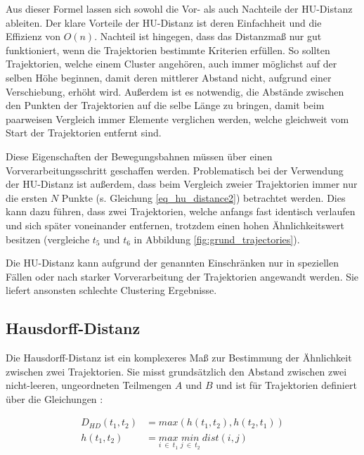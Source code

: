 Aus dieser Formel lassen sich sowohl die Vor- als auch Nachteile der HU-Distanz ableiten. Der klare Vorteile der
HU-Distanz ist deren Einfachheit und die Effizienz von $O(n)$.
Nachteil ist hingegen, dass das Distanzmaß nur gut funktioniert, wenn die Trajektorien bestimmte
Kriterien erfüllen. So sollten Trajektorien, welche einem Cluster angehören, auch immer möglichst auf der selben Höhe beginnen,
damit deren mittlerer Abstand nicht, aufgrund einer Verschiebung, erhöht wird.
Außerdem ist es notwendig, die Abstände zwischen den Punkten der Trajektorien auf die selbe Länge zu bringen,
damit beim paarweisen Vergleich immer Elemente verglichen werden, welche gleichweit vom Start der
Trajektorien entfernt sind.

Diese Eigenschaften der Bewegungsbahnen müssen über einen Vorverarbeitungsschritt geschaffen werden.
Problematisch bei der Verwendung der HU-Distanz ist außerdem, dass beim Vergleich zweier Trajektorien immer nur
die ersten $N$ Punkte (s. Gleichung \ref{eq_hu_distance2}) betrachtet werden. Dies kann dazu führen, dass zwei
Trajektorien, welche anfangs fast identisch verlaufen und sich später voneinander entfernen, trotzdem einen hohen
Ähnlichkeitswert besitzen (vergleiche $t_5$ und $t_6$ in Abbildung \ref{fig:grund_trajectories}).

Die HU-Distanz kann aufgrund der genannten Einschränken nur in speziellen Fällen oder nach starker Vorverarbeitung
der Trajektorien angewandt werden. Sie liefert ansonsten schlechte Clustering Ergebnisse.

\subsection{Hausdorff-Distanz}
\label{sec:hausdorff_distance}

Die Hausdorff-Distanz ist ein komplexeres Maß zur Bestimmung der Ähnlichkeit zwischen zwei Trajektorien.
Sie misst grundsätzlich den Abstand zwischen zwei nicht-leeren, ungeordneten Teilmengen $A$ und $B$ und ist für
Trajektorien definiert über die Gleichungen \cite[]{Atev2010}:

\begin{ceqn}
\begin{align}
\label{eq_hausdorff1}
    D_{HD}(t_1, t_2) &= max(h(t_1, t_2), h(t_2, t_1)) \\
\label{eq_hausdorff2}
    h(t_1, t_2) &= \underset{i\ \in\ t_1}{max}\ \underset{j\ \in\ t_2}{min}\ dist(i, j)
\end{align}
\end{ceqn}

